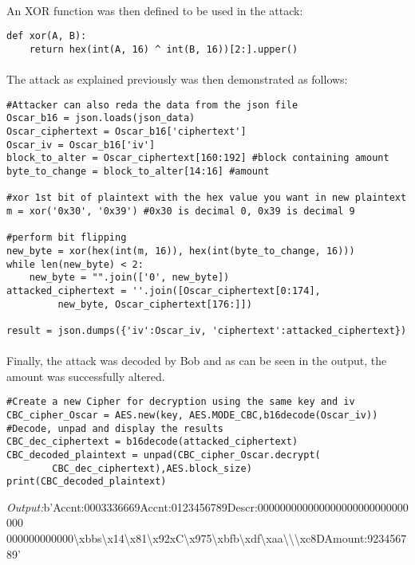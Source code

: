 \paragraph{ }An XOR function was then defined to be used in the attack:
\begin{lstlisting}
def xor(A, B):
	return hex(int(A, 16) ^ int(B, 16))[2:].upper() 
\end{lstlisting}

\paragraph{ }The attack as explained previously was then demonstrated as follows:
\begin{lstlisting}
#Attacker can also reda the data from the json file
Oscar_b16 = json.loads(json_data)
Oscar_ciphertext = Oscar_b16['ciphertext']
Oscar_iv = Oscar_b16['iv']
block_to_alter = Oscar_ciphertext[160:192] #block containing amount
byte_to_change = block_to_alter[14:16] #amount

#xor 1st bit of plaintext with the hex value you want in new plaintext
m = xor('0x30', '0x39') #0x30 is decimal 0, 0x39 is decimal 9

#perform bit flipping
new_byte = xor(hex(int(m, 16)), hex(int(byte_to_change, 16)))
while len(new_byte) < 2:
	new_byte = "".join(['0', new_byte])
attacked_ciphertext = ''.join([Oscar_ciphertext[0:174],
		 new_byte, Oscar_ciphertext[176:]]) 

result = json.dumps({'iv':Oscar_iv, 'ciphertext':attacked_ciphertext})
\end{lstlisting}

\paragraph{ }Finally, the attack was decoded by Bob and as can be seen in the output, the amount was successfully altered.
\begin{lstlisting}
#Create a new Cipher for decryption using the same key and iv
CBC_cipher_Oscar = AES.new(key, AES.MODE_CBC,b16decode(Oscar_iv))
#Decode, unpad and display the results
CBC_dec_ciphertext = b16decode(attacked_ciphertext)
CBC_decoded_plaintext = unpad(CBC_cipher_Oscar.decrypt(
		CBC_dec_ciphertext),AES.block_size)
print(CBC_decoded_plaintext)
\end{lstlisting} 
\textit{Output:}b'Accnt:0003336669Accnt:0123456789Descr:000000000000000000000000000000\\
000000000000\textbackslash xbbs\textbackslash x14\textbackslash x81\textbackslash x92xC\textbackslash x975\textbackslash xbfb\textbackslash xdf\textbackslash xaa\textbackslash \textbackslash \textbackslash xc8DAmount:923456789'

